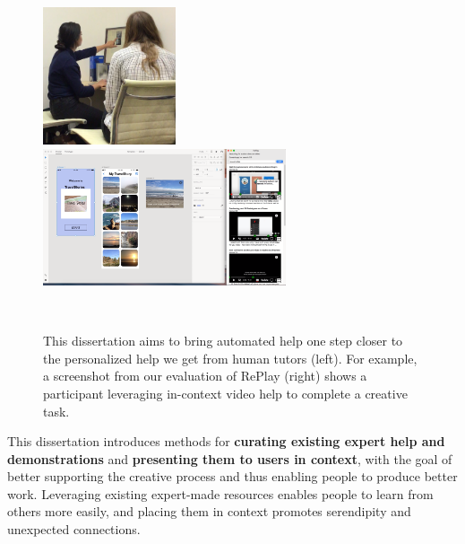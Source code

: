 \begin{figure}[b!]
\centering
  \includegraphics[width=0.35\textwidth]{figures/tutor.png}
  \hfill
  \includegraphics[width=0.64\textwidth]{figures/study.png}
  \caption{This dissertation aims to bring automated help one step closer to the personalized help we get from human tutors (left). For example, a screenshot from our evaluation of RePlay (right) shows a participant leveraging in-context video help to complete a creative task. }~\label{fig:intro_picture}
\end{figure}

This dissertation introduces methods for \textbf{curating existing expert help and demonstrations} and \textbf{presenting them to users in context}, with the goal of better supporting the creative process and thus enabling people to produce better work. Leveraging existing expert-made resources enables people to learn from others more easily, and placing them in context promotes serendipity and unexpected connections.

